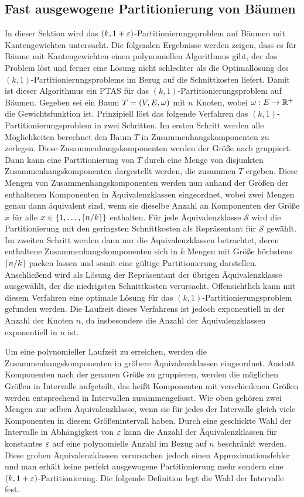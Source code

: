 \subsection{Fast ausgewogene Partitionierung von Bäumen}
In dieser Sektion wird das $(k,1+\eps)$-Partitionierungsproblem auf Bäumen mit Kantengewichten untersucht. 
Die folgenden Ergebnisse werden zeigen, dass es für Bäume mit Kantengewichten einen polynomiellen Algorithmus gibt, der das Problem löst und ferner eine Lösung nicht schlechter als die Optimallösung des $(k,1)$-Partitionierungsproblems im Bezug auf die Schnittkosten liefert.
Damit ist dieser Algorithmus ein  PTAS für das $(k,1)$-Partitionierungsproblem auf Bäumen. 
Gegeben sei ein Baum $T = (V,E,\weight)$ mit $n$ Knoten, wobei $\weight : E \rightarrow \reals^+$ die Gewichtsfunktion ist.
Prinzipiell löst das folgende Verfahren das $(k,1)$-Partitionierungsproblem in zwei Schritten.
Im ersten Schritt werden alle Möglichkeiten berechnet den Baum $T$ in Zusammenhangskomponenten zu zerlegen.
Diese Zusammenhangskomponenten werden der Größe nach gruppiert.
Dann kann eine Partitionierung von $T$ durch eine Menge von disjunkten Zusammenhangskomponenten dargestellt werden, die zusammen $T$ ergeben. 
Diese Mengen von Zusammenhangskomponenten werden nun anhand der Größen der enthaltenen Komponenten in Äquivalenzklassen eingeordnet, wobei zwei Mengen genau dann äquivalent sind, wenn sie dieselbe Anzahl an Komponenten der Größe $x$ für alle $x \in \{1, \ldots, \ceil*{n/k}\}$ enthalten.
Für jede Äquivalenzklasse $\mathcal{S}$ wird die Partitionierung mit den geringsten Schnittkosten als Repräsentant für $\mathcal{S}$ gewählt.
Im zweiten Schritt werden dann nur die Äquivalenzklassen betrachtet, deren enthaltene Zusammenhangskomponenten sich in $k$ Mengen mit Größe höchstens $\ceil*{n/k}$ packen lassen und somit eine gültige Partitionierung darstellen.
Anschließend wird als Lösung der Repräsentant der übrigen Äquivalenzklasse ausgewählt, der die niedrigsten Schnittkosten verursacht.
Offensichtlich kann mit diesem Verfahren eine optimale Lösung für das $(k,1)$-Partitionierungsproblem gefunden werden.
Die Laufzeit dieses Verfahrens ist jedoch exponentiell in der Anzahl der Knoten $n$, da insbesondere die Anzahl der Äquivalenzklassen exponentiell in $n$ ist.

Um eine polynomieller Laufzeit zu erreichen, werden die Zusammenhangskomponenten in gröbere Äquivalenzklassen eingeordnet.
Anstatt Komponenten nach der genauen Größe zu gruppieren, werden die möglichen Größen in Intervalle aufgeteilt, das heißt Komponenten mit verschiedenen Größen werden entsprechend in Intervallen zusammengefasst. 
Wie oben gehören zwei Mengen zur selben Äquivalenzklasse, wenn sie für jedes der Intervalle gleich viele Komponenten in diesem Größenintervall haben.
Durch eine geschickte Wahl der Intervalle in Abhängigkeit von $\eps$ kann die Anzahl der Äquivalenzklassen für konstantes $\eps$ auf eine polynomielle Anzahl im Bezug auf $n$ beschränkt werden.
Diese groben Äquivalenzklassen verursachen jedoch einen Approximationsfehler und man erhält keine perfekt ausgewogene Partitionierung mehr sondern eine $(k, 1+\eps)$-Partitionierung. Die folgende Definition legt die Wahl der Intervalle fest. \\

